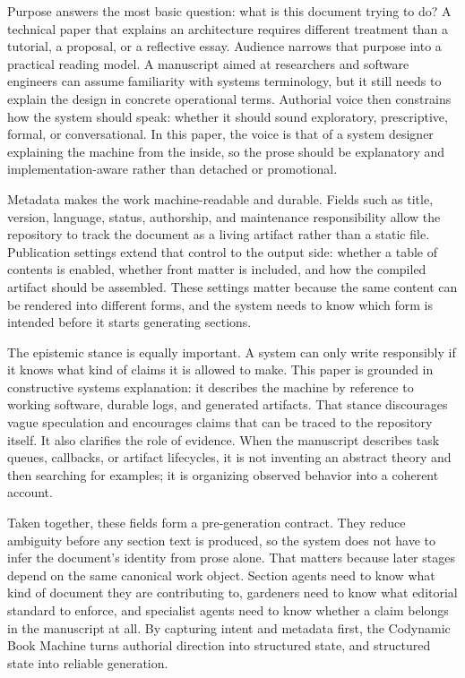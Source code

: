 \documentclass[11pt]{article}
\begin{document}
Purpose answers the most basic question: what is this document trying to do? A technical paper that explains an architecture requires different treatment than a tutorial, a proposal, or a reflective essay. Audience narrows that purpose into a practical reading model. A manuscript aimed at researchers and software engineers can assume familiarity with systems terminology, but it still needs to explain the design in concrete operational terms. Authorial voice then constrains how the system should speak: whether it should sound exploratory, prescriptive, formal, or conversational. In this paper, the voice is that of a system designer explaining the machine from the inside, so the prose should be explanatory and implementation-aware rather than detached or promotional.

Metadata makes the work machine-readable and durable. Fields such as title, version, language, status, authorship, and maintenance responsibility allow the repository to track the document as a living artifact rather than a static file. Publication settings extend that control to the output side: whether a table of contents is enabled, whether front matter is included, and how the compiled artifact should be assembled. These settings matter because the same content can be rendered into different forms, and the system needs to know which form is intended before it starts generating sections.

The epistemic stance is equally important. A system can only write responsibly if it knows what kind of claims it is allowed to make. This paper is grounded in constructive systems explanation: it describes the machine by reference to working software, durable logs, and generated artifacts. That stance discourages vague speculation and encourages claims that can be traced to the repository itself. It also clarifies the role of evidence. When the manuscript describes task queues, callbacks, or artifact lifecycles, it is not inventing an abstract theory and then searching for examples; it is organizing observed behavior into a coherent account.

Taken together, these fields form a pre-generation contract. They reduce ambiguity before any section text is produced, so the system does not have to infer the document's identity from prose alone. That matters because later stages depend on the same canonical work object. Section agents need to know what kind of document they are contributing to, gardeners need to know what editorial standard to enforce, and specialist agents need to know whether a claim belongs in the manuscript at all. By capturing intent and metadata first, the Codynamic Book Machine turns authorial direction into structured state, and structured state into reliable generation.
\end{document}
